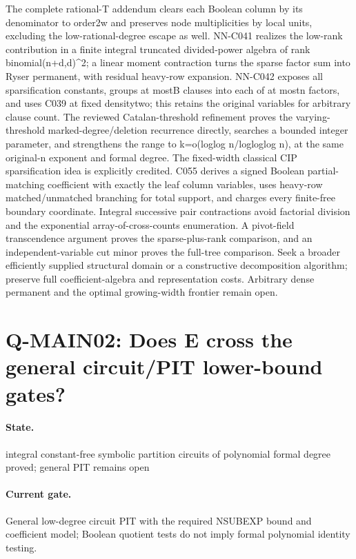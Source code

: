 The complete rational-T addendum clears each Boolean column by its denominator to order2w and preserves node multiplicities by local units, excluding the low-rational-degree escape as well. NN-C041 realizes the low-rank contribution in a finite integral truncated divided-power algebra of rank binomial(n+d,d)\textasciicircum{}2; a linear moment contraction turns the sparse factor sum into Ryser permanent, with residual heavy-row expansion. NN-C042 exposes all sparsification constants, groups at mostB clauses into each of at mostn factors, and uses C039 at fixed densitytwo; this retains the original variables for arbitrary clause count. The reviewed Catalan-threshold refinement proves the varying-threshold marked-degree/deletion recurrence directly, searches a bounded integer parameter, and strengthens the range to k=o(loglog n/logloglog n), at the same original-n exponent and formal degree. The fixed-width classical CIP sparsification idea is explicitly credited. C055 derives a signed Boolean partial-matching coefficient with exactly the leaf column variables, uses heavy-row matched/unmatched branching for total support, and charges every finite-free boundary coordinate. Integral successive pair contractions avoid factorial division and the exponential array-of-cross-counts enumeration. A pivot-field transcendence argument proves the sparse-plus-rank comparison, and an independent-variable cut minor proves the full-tree comparison. Seek a broader efficiently supplied structural domain or a constructive decomposition algorithm; preserve full coefficient-algebra and representation costs. Arbitrary dense permanent and the optimal growing-width frontier remain open.

\section{Q-MAIN02: Does E cross the general circuit/PIT lower-bound gates?}
\paragraph{State.} integral constant-free symbolic partition circuits of polynomial formal degree proved; general PIT remains open
\paragraph{Current gate.} General low-degree circuit PIT with the required NSUBEXP bound and coefficient model; Boolean quotient tests do not imply formal polynomial identity testing.
